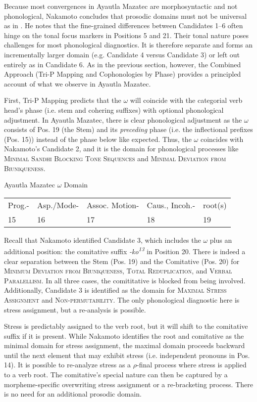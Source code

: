 \documentclass[output=paper]{langscibook}
\begin{document}
Because most convergences in Ayautla Mazatec are morphosyntactic and not phonological, Nakamoto concludes that prosodic domains must not be universal as in \citet{schiering:2010}. He notes that the fine-grained differences between Candidates 1--6 often hinge on the tonal focus markers in Positions 5 and 21. Their tonal nature poses challenges for most phonological diagnostics. It is therefore separate and forms an incrementally larger domain (e.g. Candidate 4 versus Candidate 3) or left out entirely as in Candidate 6. As in the previous section, however, the Combined Approach (Tri-P Mapping and Cophonologies by Phase) provides a principled account of what we observe in Ayautla Mazatec. 

First, Tri-P Mapping predicts that the $\omega$ will coincide with the categorial verb head's phase (i.e. stem and cohering suffixes) with optional phonological adjustment. In Ayautla Mazatec, there is clear phonological adjustment as the $\omega$ consists of Pos. 19 (the Stem) and its \textit{preceding} phase (i.e. the inflectional prefixes (Pos. 15)) instead of the phase below like expected. Thus, the $\omega$ coincides with Nakamoto's Candidate 2, and it is the domain for phonological processes like {\textsc{Minimal Sandhi Blocking Tone Sequences}} and {\textsc{Minimal Deviation from Biuniqueness}}. 

\ea
    Ayautla Mazatec $\omega$ Domain \\
        \begin{tabular}{lllll}
            Prog.- & Asp./Mode- & Assoc. Motion- & Caus., Incoh.- & root(s)  \\
            15 & 16 & 17 & 18 & 19  
        \end{tabular}
\z

Recall that Nakamoto identified Candidate 3, which includes the $\omega$ plus an additional position: the comitative suffix \textit{-ko\textsuperscript{13}} in Position 20. There is indeed a clear separation between the Stem (Pos. 19) and the Comitative (Pos. 20) for {\textsc{Minimum Deviation from Biuniqueness}}, {\textsc{Total Reduplication}}, and {\textsc{Verbal Paralellism}}. In all three cases, the comititative is blocked from being involved. Additionally, Candidate 3 is identified as the domain for {\textsc{Maximal Stress Assignment}} and {\textsc{Non-permutability}}. The only phonological diagnostic here is stress assignment, but a re-analysis is possible.

Stress is predictably assigned to the verb root, but it will shift to the comitative suffix if it is present. While Nakamoto identifies the root and comitative as the minimal domain for stress assignment, the maximal domain proceeds backward until the next element that may exhibit stress (i.e. independent pronouns in Pos. 14). It is possible to re-analyze stress as a $\rho$-final process where stress is applied to a verb root. The comitative's special nature can then be captured by a morpheme-specific overwriting stress assignment or a re-bracketing process. There is no need for an additional prosodic domain.
\end{document}
